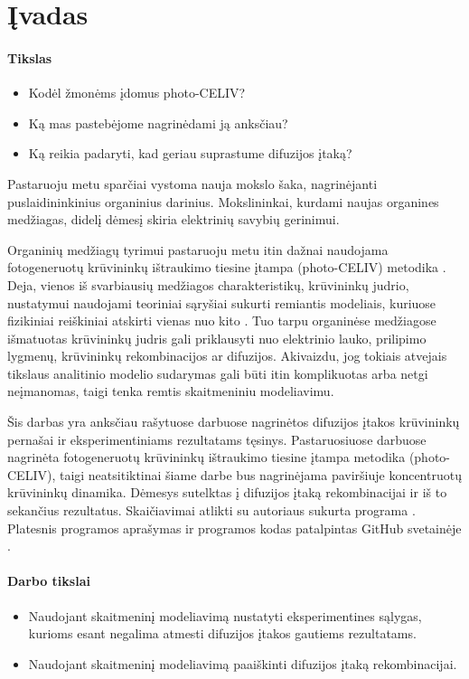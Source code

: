 \section{Įvadas}

\paragraph*{Tikslas}
\begin{itemize}
\item Kodėl žmonėms įdomus photo-CELIV?
\item Ką mas pastebėjome nagrinėdami ją anksčiau?
\item Ką reikia padaryti, kad geriau suprastume difuzijos įtaką?
\end{itemize}

Pastaruoju metu sparčiai vystoma nauja mokslo šaka, nagrinėjanti puslaidininkinius organinius darinius. Mokslininkai, kurdami naujas organines medžiagas, didelį dėmesį skiria elektrinių savybių gerinimui.

Organinių medžiagų tyrimui pastaruoju metu itin dažnai naudojama fotogeneruotų krūvininkų ištraukimo tiesine įtampa (photo-CELIV) metodika \cite{juška:155202}. Deja, vienos iš svarbiausių medžiagos charakteristikų, krūvininkų judrio, nustatymui naudojami teoriniai sąryšiai sukurti remiantis modeliais, kuriuose fizikiniai reiškiniai atskirti vienas nuo kito \cite{langevin}. Tuo tarpu organinėse medžiagose išmatuotas krūvininkų judris gali priklausyti nuo elektrinio lauko, prilipimo lygmenų, krūvininkų rekombinacijos ar difuzijos. Akivaizdu, jog tokiais atvejais tikslaus analitinio modelio sudarymas gali būti itin komplikuotas arba netgi neįmanomas, taigi tenka remtis skaitmeniniu modeliavimu.

Šis darbas yra anksčiau rašytuose darbuose \cite{vytis:kursinis, juška:155202} nagrinėtos difuzijos įtakos krūvininkų pernašai ir eksperimentiniams rezultatams tęsinys. Pastaruosiuose darbuose nagrinėta fotogeneruotų krūvininkų ištraukimo tiesine įtampa metodika (photo-CELIV), taigi neatsitiktinai šiame darbe bus nagrinėjama paviršiuje koncentruotų krūvininkų dinamika. Dėmesys sutelktas į difuzijos įtaką rekombinacijai ir iš to sekančius rezultatus.
Skaičiavimai atlikti su autoriaus sukurta programa \cite{vytis:openreadings2010}. Platesnis programos aprašymas ir programos kodas patalpintas GitHub svetainėje \cite{doi@github}.

\paragraph{Darbo tikslai}
\begin{itemize}
\item Naudojant skaitmeninį modeliavimą nustatyti eksperimentines sąlygas, kurioms esant negalima atmesti difuzijos įtakos gautiems rezultatams.
\item Naudojant skaitmeninį modeliavimą paaiškinti difuzijos įtaką rekombinacijai.
\end{itemize}
